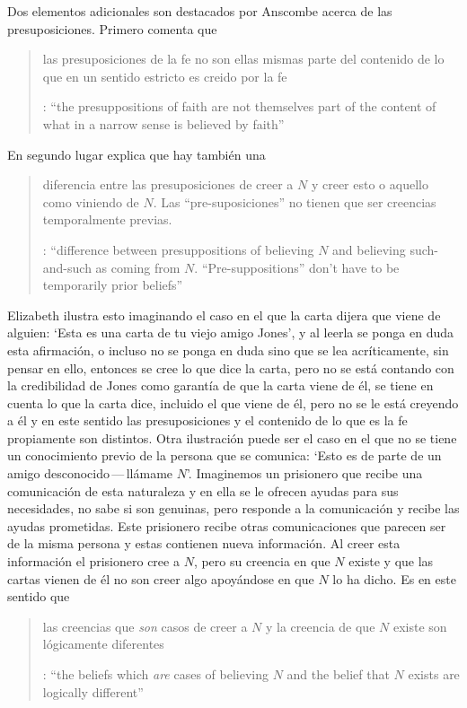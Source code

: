 Dos elementos adicionales son destacados por Anscombe acerca de las presuposiciones. Primero comenta que \blockquote[{\cite[117]{anscombe1981erp:faith}}: \enquote{the presuppositions of faith are not themselves part of the content of what in a narrow sense is believed by faith}]{las presuposiciones de la fe no son ellas mismas parte del contenido de lo que en un sentido estricto es creido por la fe}. En segundo lugar explica que hay también una \blockquote[{\cite[118]{anscombe1981erp:faith}}: \enquote{difference between presuppositions of believing $N$ and believing such-and-such as coming from $N$. ``Pre-suppositions'' don't have to be temporarily prior beliefs}]{diferencia entre las presuposiciones de creer a $N$ y creer esto o aquello como viniendo de $N$. Las ``pre-suposiciones'' no tienen que ser creencias temporalmente previas.}. Elizabeth ilustra esto imaginando el caso en el que la carta dijera que viene de alguien: \enquote*{Esta es una carta de tu viejo amigo Jones}, y al leerla se ponga en duda esta afirmación, o incluso no se ponga en duda sino que se lea acríticamente, sin pensar en ello, entonces se cree lo que dice la carta, pero no se está contando con la credibilidad de Jones como garantía de que la carta viene de él, se tiene en cuenta lo que la carta dice, incluido el que viene de él, pero no se le está creyendo a él y en este sentido las presuposiciones y el contenido de lo que es la fe propiamente son distintos. Otra ilustración puede ser el caso en el que no se tiene un conocimiento previo de la persona que se comunica: \enquote*{Esto es de parte de un amigo desconocido\,---\,llámame $N$}. Imaginemos un prisionero que recibe una comunicación de esta naturaleza y en ella se le ofrecen ayudas para sus necesidades, no sabe si son genuinas, pero responde a la comunicación y recibe las ayudas prometidas. Este prisionero recibe otras comunicaciones que parecen ser de la misma persona y estas contienen nueva información. Al creer esta información el prisionero cree a $N$, pero su creencia en que $N$ existe y que las cartas vienen de él no son creer algo apoyándose en que $N$ lo ha dicho. Es en este sentido que \blockquote[{\cite[118]{anscombe1981erp:faith}}: \enquote{the beliefs which \emph{are} cases of believing $N$ and the belief that $N$ exists are logically different}]{las creencias que \emph{son} casos de creer a $N$ y la creencia de que $N$ existe son lógicamente diferentes}.

